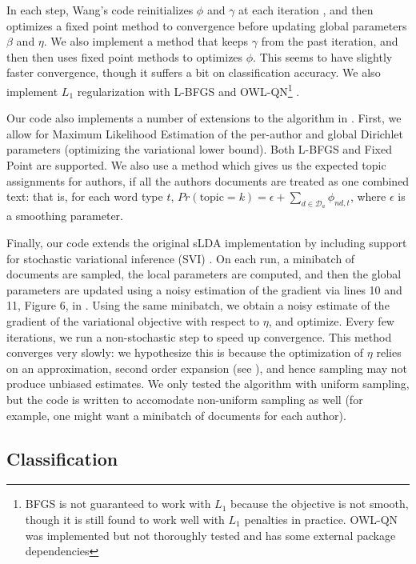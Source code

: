 \documentclass[14pt]{article} %
\theoremstyle{plain}
\theoremstyle{definition}
\theoremstyle{remark}
\begin{document}
\begin{appendix}
In each step, Wang's code reinitializes $\phi$ and $\gamma$ at each iteration \cite{wang2009simultaneous}, and then optimizes a fixed point method to convergence before updating global parameters $\beta$ and $\eta$. We also implement a method that keeps $\gamma$ from the past iteration, and then then uses fixed point methods to optimizes $\phi$. This seems to have slightly faster convergence, though it suffers a bit on classification accuracy. We also implement $L_1$ regularization with L-BFGS \cite{liu1989limited} and OWL-QN\footnote{BFGS is not guaranteed to work with $L_1$ because the objective is not smooth, though it is still found to work well with $L_1$ penalties in practice. OWL-QN was implemented but not thoroughly tested and has some external package dependencies} \cite{andrew2007scalable}.

Our code also implements a number of extensions to the algorithm in \cite{wang2009simultaneous}. First, we allow for Maximum Likelihood Estimation of the per-author and global Dirichlet parameters (optimizing the variational lower bound). Both L-BFGS and Fixed Point \cite{minka2000estimating} are supported. We also use a method which gives us the expected topic assignments for authors, if all the authors documents are treated as one combined text: that is, for each word type $t$, $Pr(\text{topic}=k) = \epsilon + \sum_{d\in \mathcal{D}_a}\phi_{nd,t}$, where $\epsilon$ is a smoothing parameter.

Finally, our code extends the original sLDA implementation by including support for stochastic variational inference (SVI) \cite{hoffman2013stochastic}. On each run, a minibatch of documents are sampled, the local parameters are computed, and then the global parameters are updated using a noisy estimation of the gradient via lines 10 and 11, Figure 6, in  \cite{hoffman2013stochastic}. Using the same minibatch, we obtain a noisy estimate of the gradient of the variational objective with respect to $\eta$, and optimize. Every few iterations, we run a non-stochastic step to speed up convergence. This method converges very slowly: we hypothesize this is because the optimization of $\eta$ relies on an approximation, second order expansion (see \cite{wang2009simultaneous}), and hence sampling may not produce unbiased estimates. We only tested the algorithm with uniform sampling, but the code is written to accomodate non-uniform sampling as well (for example, one might want a minibatch of documents for each author).


\subsection{Classification}
\label{appendix:classification}


\end{appendix}
\end{document}
